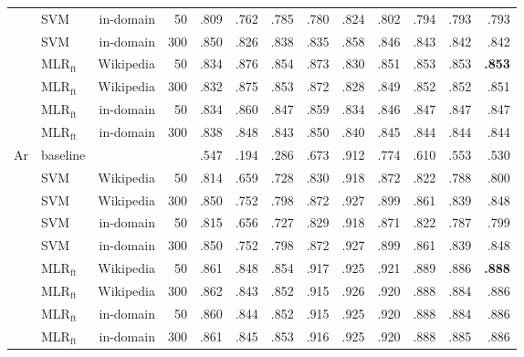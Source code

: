 \documentclass[epsfig,a4paper,12pt,titlepage]{book}
\newcommand{\mlr}{MLR$_\text{ft}$\xspace}
\begin{document}
\begin{table}[H]
\begin{center}
\begin{adjustbox}{width=\textwidth}
\begin{tabular}{|llr@{\hskip 0.3in}rrrr|rrr|rrr|}
                & SVM   & in-domain   & 50   & .809  & .762  & .785  & .780  & .824  & .802  & .794 & .793 & .793                           \\
                & SVM   & in-domain   & 300  &  .850  & .826  & .838  & .835 & .858  & .846  & .843 & .842 & .842                           \\
                & \mlr & Wikipedia & 50   & .834  & .876  &  .854  & .873  & .830  & .851  & .853 & .853 & \textbf{.853}                  \\
                & \mlr & Wikipedia & 300  & .832  & .875  &  .853  & .872  & .828  & .849  & .852 & .852 & .851                 \\
                 & \mlr& in-domain & 50   & .834  & .860  & .847  & .859  & .834  & .846  & .847 & .847 & .847                  \\
                 & \mlr& in-domain & 300  & .838  & .848  & .843  & .850  & .840  & .845  & .844 & .844 & .844                 \\
                 \hline
\multirow{9}{*}{Ar}
                & baseline &  &    & .547  & .194  & .286  & .673  & .912  & .774  & .610 & .553 & .530                          \\
                   & SVM & Wikipedia      & 50   & .814  & .659  & .728  & .830  & .918  & .872  & .822 & .788 & .800     \\
                 & SVM  & Wikipedia    & 300  & .850  & .752  & .798  & .872  & .927  & .899  & .861 & .839 & .848                           \\
                & SVM   & in-domain   & 50   & .815  & .656  & .727  & .829  & .918  & .871  & .822 & .787 & .799     \\
                & SVM   & in-domain   & 300  & .850  & .752  & .798  & .872  & .927  & .899  & .861 & .839 & .848                           \\
                    & \mlr & Wikipedia & 50   & .861  & .848  & .854  & .917  & .925  & .921  & .889 & .886 & \textbf{.888}                \\
                & \mlr & Wikipedia & 300  & .862  & .843  & .852  & .915  & .926  & .920  & .888 & .884 & .886                            \\
                   & \mlr & in-domain & 50   & .860  & .844  & .852  & .915  & .925  & .920  & .888 & .884 & .886                \\
                 & \mlr & in-domain & 300  & .861  & .845  & .853  & .916  & .925  & .920  & .888 & .885 & .886                            \\
            

\end{tabular}
\end{adjustbox}
\end{center}
\end{table}
\end{document}
